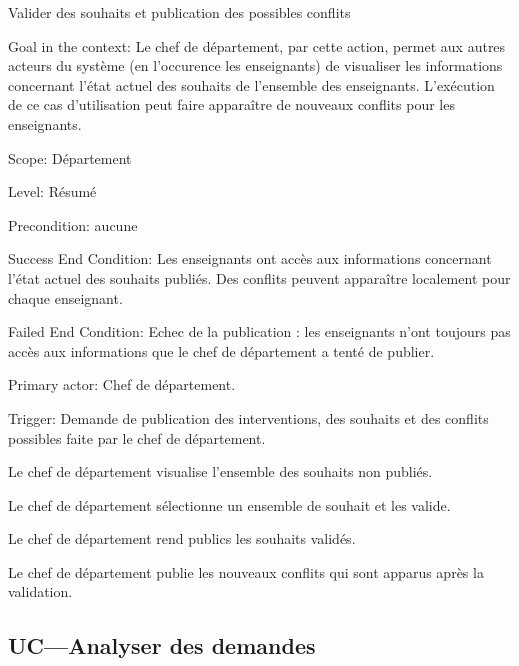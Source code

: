 \begin{ocl}
\begin{usecase}{Valider des souhaits et publication des possibles conflits}
\begin{information}
\item[{Goal in the context:}]
 Le chef de département, par cette action, permet aux autres acteurs du système (en l'occurence les enseignants) de visualiser les informations concernant l'état actuel des souhaits de l'ensemble des enseignants. 
L'exécution de ce cas d'utilisation peut faire apparaître de nouveaux conflits pour les enseignants.

\item[Scope:] Département

 \item[{Level:}] Résumé

 \item[Precondition:] aucune

 \item[{Success End Condition:}]
Les enseignants ont accès aux informations concernant l'état actuel des souhaits publiés. 
Des conflits peuvent apparaître localement pour chaque enseignant.

 \item[{Failed End Condition:}]
 Echec de la publication : les enseignants n'ont toujours pas accès aux informations que le chef de département a tenté de publier.

\item[Primary actor:] Chef de département.

 \item[{Trigger:}]
 Demande de publication des interventions, des souhaits et des conflits possibles faite par le chef de département.
\end{information}

\begin{scenario}
\item Le chef de département visualise l'ensemble des souhaits non publiés.
 \item Le chef de département sélectionne un ensemble de souhait et les valide.
 \item Le chef de département rend publics les souhaits validés.
 \item Le chef de département publie les nouveaux conflits qui sont apparus après la validation.
\end{scenario}

\end{usecase}

 \subsection{UC---Analyser des demandes}


\end{ocl}
